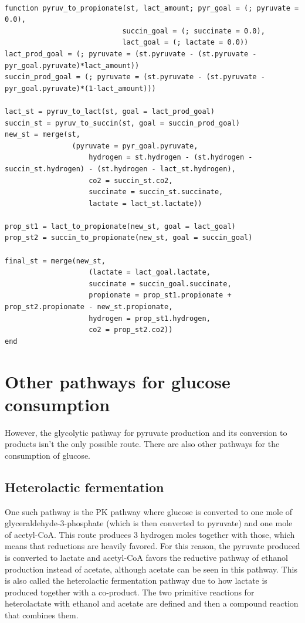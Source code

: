 \documentclass[11pt]{article}
\begin{document}
\begin{verbatim}

function pyruv_to_propionate(st, lact_amount; pyr_goal = (; pyruvate = 0.0),
                            succin_goal = (; succinate = 0.0),
                            lact_goal = (; lactate = 0.0))
lact_prod_goal = (; pyruvate = (st.pyruvate - (st.pyruvate - pyr_goal.pyruvate)*lact_amount))
succin_prod_goal = (; pyruvate = (st.pyruvate - (st.pyruvate - pyr_goal.pyruvate)*(1-lact_amount)))

lact_st = pyruv_to_lact(st, goal = lact_prod_goal)
succin_st = pyruv_to_succin(st, goal = succin_prod_goal)
new_st = merge(st,
                (pyruvate = pyr_goal.pyruvate,
                    hydrogen = st.hydrogen - (st.hydrogen - succin_st.hydrogen) - (st.hydrogen - lact_st.hydrogen),
                    co2 = succin_st.co2,
                    succinate = succin_st.succinate,
                    lactate = lact_st.lactate))

prop_st1 = lact_to_propionate(new_st, goal = lact_goal)
prop_st2 = succin_to_propionate(new_st, goal = succin_goal)

final_st = merge(new_st,
                    (lactate = lact_goal.lactate,
                    succinate = succin_goal.succinate,
                    propionate = prop_st1.propionate + prop_st2.propionate - new_st.propionate,
                    hydrogen = prop_st1.hydrogen,
                    co2 = prop_st2.co2))
end

\end{verbatim}

\section{Other pathways for glucose consumption}
\label{sec:org0ddf1fb}
However, the glycolytic pathway for pyruvate production and its conversion to products isn't the only possible route. There are also other pathways for the consumption of glucose.

\subsection{Heterolactic fermentation}
\label{sec:orgfd40084}
One such pathway is the PK pathway where glucose is converted to one mole of glyceraldehyde-3-phosphate (which is then converted to pyruvate) and one mole of acetyl-CoA. This route produces 3 hydrogen moles together with those, which means that reductions are heavily favored. For this reason, the pyruvate produced is converted to lactate and acetyl-CoA favors the reductive pathway of ethanol production instead of acetate, although acetate can be seen in this pathway. This is also called the heterolactic fermentation pathway due to how lactate is produced together with a co-product. The two primitive reactions for heterolactate with ethanol and acetate are defined and then a compound reaction that combines them.
\end{document}
